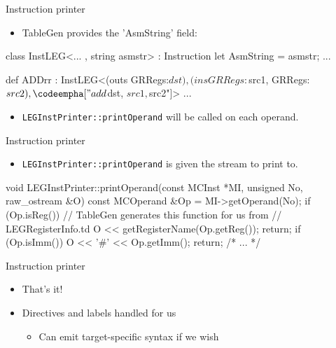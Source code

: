 \begin{frame}[fragile]{Instruction printer}

\begin{itemize}
    \item TableGen provides the 'AsmString' field:
\end{itemize}

\begin{codebox}
class InstLEG<... , string asmstr> : Instruction {
  let AsmString = asmstr;
  ...
}
\end{codebox}

\begin{codebox}[commandchars=\\\[\]]
def ADDrr : InstLEG<(outs GRRegs:$dst),
                    (ins GRRegs:$src1, GRRegs:$src2),
                    \codeempha["add $dst, $src1, $src2"]> {
  ...
}
\end{codebox}

\begin{itemize}
    \item \texttt{LEGInstPrinter::printOperand} will be called on each operand.
\end{itemize}

\end{frame}


\begin{frame}[fragile]{Instruction printer}

\begin{itemize}
    \item \texttt{LEGInstPrinter::printOperand} is given the stream to print to.
\end{itemize}

\begin{codebox}
void LEGInstPrinter::printOperand(const MCInst *MI, unsigned No,
                                  raw_ostream &O) {
  const MCOperand &Op = MI->getOperand(No);
  if (Op.isReg()) {
    // TableGen generates this function for us from   
    // LEGRegisterInfo.td
    O << getRegisterName(Op.getReg());
    return;
  }
  if (Op.isImm()) {
    O << '#' << Op.getImm();
    return;
  }
  /* ... */
}
\end{codebox}

\end{frame}


\begin{frame}{Instruction printer}

\begin{itemize}
    \item That's it!
    \item Directives and labels handled for us
    \begin{itemize}
        \item Can emit target-specific syntax if we wish
    \end{itemize}
\end{itemize}


\end{frame}
